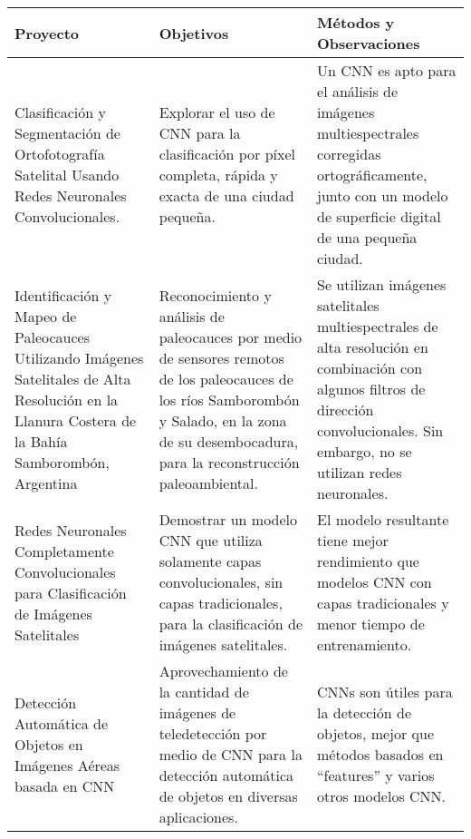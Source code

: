 \begin{center}
    \begin{table}[h!]
        \small
        \begin{tabular}{|m{4cm}|m{5cm}|m{6.2cm}|}
            \hline
            \bf Proyecto & \bf Objetivos & \bf Métodos y Observaciones \\
            \hline
            Clasificación y Segmentación de Ortofotografía Satelital Usando Redes Neuronales Convolucionales.
            \autocite{langkvist-2016} \hspace{-\textwidth} & Explorar el uso de CNN para la clasificación por píxel
            completa, rápida y exacta de una ciudad pequeña. & Un CNN es apto para el análisis de imágenes
            multiespectrales corregidas ortográficamente, junto con un modelo de superficie digital de una pequeña
            ciudad. \\
            \hline
            Identificación y Mapeo de Paleocauces Utilizando Imágenes Satelitales de Alta Resolución en la Llanura
            Costera de la Bahía Samborombón, Argentina \autocite{luengo-2016} & Reconocimiento y análisis de
            paleocauces por medio de sensores remotos de los paleocauces de los ríos Samborombón y Salado, en la zona
            de su desembocadura, para la reconstrucción paleoambiental. & Se utilizan imágenes satelitales
            multiespectrales de alta resolución en combinación con algunos filtros de dirección convolucionales. Sin
            embargo, no se utilizan redes neuronales. \\
            \hline
            Redes Neuronales Completamente Convolucionales para Clasificación de Imágenes Satelitales
            \autocite{maggiori-2016-1} & Demostrar un modelo CNN que utiliza solamente capas convolucionales, sin capas
            tradicionales, para la clasificación de imágenes satelitales. & El modelo resultante tiene mejor
            rendimiento que modelos CNN con capas tradicionales y menor tiempo de entrenamiento. \\
            \hline
            Detección Automática de Objetos en Imágenes Aéreas basada en CNN \autocite{sevo-2016} & Aprovechamiento de
            la cantidad de imágenes de teledetección por medio de CNN para la detección automática de objetos en
            diversas aplicaciones. & CNNs son útiles para la detección de objetos, mejor que métodos basados en
            \enquote{features} y varios otros modelos CNN. \\
            \hline

\end{tabular}
\end{table}
\end{center}

